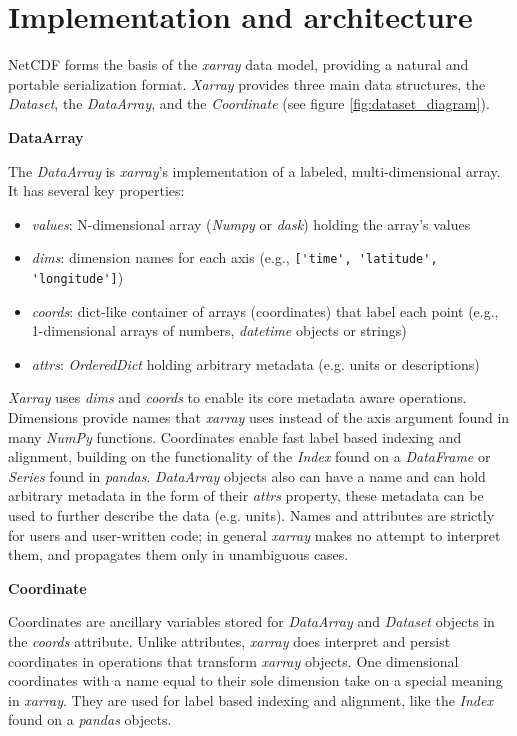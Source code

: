 \documentclass{jors}
\begin{document}
\section*{Implementation and architecture}

NetCDF forms the basis of the \textit{xarray} data model, providing a natural and portable serialization format.
\textit{Xarray} provides three main data structures, the \textit{Dataset}, the \textit{DataArray}, and the \textit{Coordinate} (see figure \ref{fig:dataset_diagram}).

\textbf{DataArray}

The \textit{DataArray} is \textit{xarray}'s implementation of a labeled, multi-dimensional array. It has several key properties:

\begin{itemize}
	\item \textit{values}: N-dimensional array (\textit{Numpy} or \textit{dask}) holding the array’s values
	\item \textit{dims}: dimension names for each axis (e.g., \verb|['time', 'latitude', 'longitude']|)
	\item \textit{coords}: dict-like container of arrays (coordinates) that label each point (e.g., 1-dimensional arrays of numbers, \textit{datetime} objects or strings)
	\item \textit{attrs}: \textit{OrderedDict} holding arbitrary metadata (e.g. units or descriptions)
\end{itemize}

\textit{Xarray} uses \textit{dims} and \textit{coords} to enable its core metadata aware operations.
Dimensions provide names that \textit{xarray} uses instead of the axis argument found in many \textit{NumPy} functions.
Coordinates enable fast label based indexing and alignment, building on the functionality of the \textit{Index} found on a \textit{DataFrame} or \textit{Series} found in \textit{pandas}.
\textit{DataArray} objects also can have a name and can hold arbitrary metadata in the form of their \textit{attrs} property, these metadata can be used to further describe the data (e.g. units).
Names and attributes are strictly for users and user-written code; in general \textit{xarray} makes no attempt to interpret them, and propagates them only in unambiguous cases.

\textbf{Coordinate}

Coordinates are ancillary variables stored for \textit{DataArray} and \textit{Dataset} objects in the \textit{coords} attribute.
Unlike attributes, \textit{xarray} does interpret and persist coordinates in operations that transform \textit{xarray} objects.
One dimensional coordinates with a name equal to their sole dimension take on a special meaning in \textit{xarray}.
They are used for label based indexing and alignment, like the \textit{Index} found on a \textit{pandas} objects.
\end{document}

